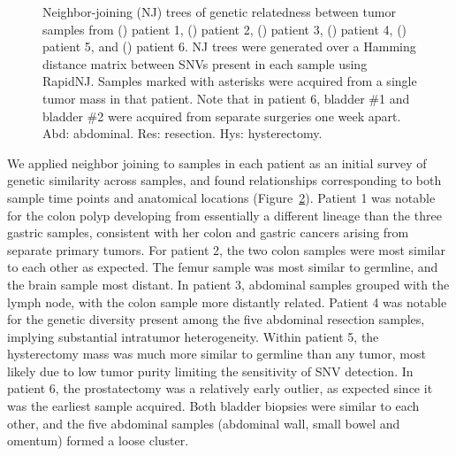 \begin{figure}[htp]
\begin{subfigure}{0.49\textwidth}
		\caption{}\label{fig:msiclones:NJ_trees_6}
	\end{subfigure}
	\caption[Neighbor-joining (NJ) trees of genetic relatedness between tumor samples.]{Neighbor-joining (NJ) trees of genetic relatedness between tumor samples from () patient 1, () patient 2, () patient 3, () patient 4, () patient 5, and () patient 6. NJ trees were generated over a Hamming distance matrix between SNVs present in each sample using RapidNJ\@. Samples marked with asterisks were acquired from a single tumor mass in that patient. Note that in patient 6, bladder \#1 and bladder \#2 were acquired from separate surgeries one week apart. Abd: abdominal. Res: resection. Hys: hysterectomy.}
	\label{fig:msiclones:NJ_trees}
\end{figure}

We applied neighbor joining to samples in each patient as an initial survey of genetic similarity across samples, and found relationships corresponding to both sample time points and anatomical locations (Figure~\ref{fig:msiclones:NJ_trees}). Patient 1 was notable for the colon polyp developing from essentially a different lineage than the three gastric samples, consistent with her colon and gastric cancers arising from separate primary tumors. For patient 2, the two colon samples were most similar to each other as expected. The femur sample was most similar to germline, and the brain sample most distant. In patient 3, abdominal samples grouped with the lymph node, with the colon sample more distantly related. Patient 4 was notable for the genetic diversity present among the five abdominal resection samples, implying substantial intratumor heterogeneity. Within patient 5, the hysterectomy mass was much more similar to germline than any tumor, most likely due to low tumor purity limiting the sensitivity of SNV detection. In patient 6, the prostatectomy was a relatively early outlier, as expected since it was the earliest sample acquired. Both bladder biopsies were similar to each other, and the five abdominal samples (abdominal wall, small bowel and omentum) formed a loose cluster.

